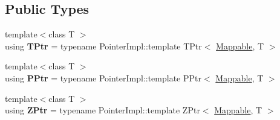 \subsection*{Public Types}
\begin{DoxyCompactItemize}
\item 
{\footnotesize template$<$class T $>$ }\\using {\bfseries T\+Ptr} = typename Pointer\+Impl\+::template T\+Ptr$<$ \hyperlink{classalps_1_1Mappable}{Mappable}, T $>$\hypertarget{classalps_1_1Mappable_acaa8e7c54b38126cd6c25c5ed26fbe87}{}\label{classalps_1_1Mappable_acaa8e7c54b38126cd6c25c5ed26fbe87}

\item 
{\footnotesize template$<$class T $>$ }\\using {\bfseries P\+Ptr} = typename Pointer\+Impl\+::template P\+Ptr$<$ \hyperlink{classalps_1_1Mappable}{Mappable}, T $>$\hypertarget{classalps_1_1Mappable_ac29c1a848f5fae659e2f03296ddc4e8a}{}\label{classalps_1_1Mappable_ac29c1a848f5fae659e2f03296ddc4e8a}

\item 
{\footnotesize template$<$class T $>$ }\\using {\bfseries Z\+Ptr} = typename Pointer\+Impl\+::template Z\+Ptr$<$ \hyperlink{classalps_1_1Mappable}{Mappable}, T $>$\hypertarget{classalps_1_1Mappable_ace436b9205b93077e8b4696b394ccc97}{}\label{classalps_1_1Mappable_ace436b9205b93077e8b4696b394ccc97}

\end{DoxyCompactItemize}
